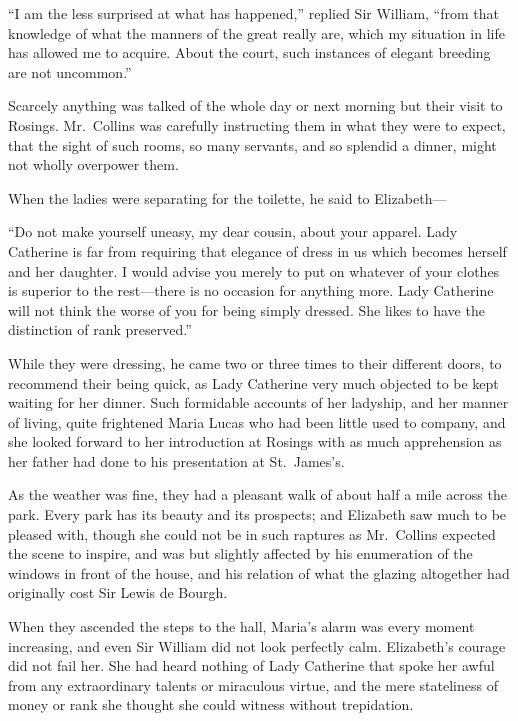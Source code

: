 \documentclass[12pt,english]{book}
\begin{document}
{}``I am the less surprised at what has happened,'' replied Sir
William, {}``from that knowledge of what the manners of the great
really are, which my situation in life has allowed me to acquire.
About the court, such instances of elegant breeding are not uncommon.''

Scarcely anything was talked of the whole day or next morning but
their visit to Rosings. Mr.\ Collins was carefully instructing them
in what they were to expect, that the sight of such rooms, so many
servants, and so splendid a dinner, might not wholly overpower them.

When the ladies were separating for the toilette, he said to Elizabeth\mbox{---}

{}``Do not make yourself uneasy, my dear cousin, about your apparel.
Lady Catherine is far from requiring that elegance of dress in us
which becomes herself and her daughter. I would advise you merely
to put on whatever of your clothes is superior to the rest\mbox{---}there
is no occasion for anything more. Lady Catherine will not think the
worse of you for being simply dressed. She likes to have the distinction
of rank preserved.''

While they were dressing, he came two or three times to their different
doors, to recommend their being quick, as Lady Catherine very much
objected to be kept waiting for her dinner. Such formidable accounts
of her ladyship, and her manner of living, quite frightened Maria
Lucas who had been little used to company, and she looked forward
to her introduction at Rosings with as much apprehension as her father
had done to his presentation at St.\ James's.

As the weather was fine, they had a pleasant walk of about half a
mile across the park. Every park has its beauty and its prospects;
and Elizabeth saw much to be pleased with, though she could not be
in such raptures as Mr.\ Collins expected the scene to inspire, and
was but slightly affected by his enumeration of the windows in front
of the house, and his relation of what the glazing altogether had
originally cost Sir Lewis de Bourgh.

When they ascended the steps to the hall, Maria's alarm was every
moment increasing, and even Sir William did not look perfectly calm.
Elizabeth's courage did not fail her. She had heard nothing of Lady
Catherine that spoke her awful from any extraordinary talents or miraculous
virtue, and the mere stateliness of money or rank she thought she
could witness without trepidation.
\end{document}
